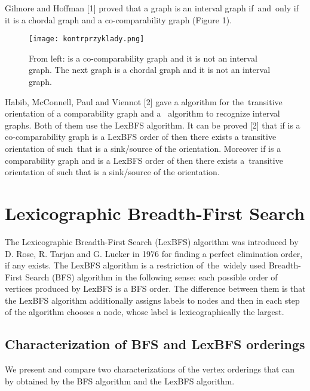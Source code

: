\documentclass[a4paper, 11pt]{article}
\begin{document}
Gilmore and Hoffman [1] proved that a graph is an interval graph if~and~only if it is a chordal 
graph and a co-comparability graph (Figure 1). 

\begin{figure}[h]
    \begin{center}
        \texttt{[image: kontrprzyklady.png]}
        \caption{From left:  is a co-comparability graph and it is not an interval graph.
        The next graph is a chordal graph and it is not an interval graph.}
    \end{center}
\end{figure}

\newpage

Habib, McConnell, Paul and Viennot [2] gave a  algorithm for the~transitive orientation 
of a comparability graph and a~\text{} algorithm to recognize interval graphs. Both of them
use the LexBFS algorithm. It can be proved [2] that if  is a co-comparability graph  is a LexBFS order of  then there exists a transitive orientation 
of  such~that  is a sink/source of the orientation. Moreover if  is a 
comparability graph and  is a LexBFS order of  then there 
exists a~transitive orientation of  such that  is a sink/source of the orientation. 



\section{Lexicographic Breadth-First Search}

The Lexicographic Breadth-First Search (LexBFS) algorithm was introduced by D. Rose, R. Tarjan 
and G. Lueker in 1976 for finding a perfect elimination order, if any exists. The LexBFS 
algorithm is a restriction of~the~widely used Breadth-First Search (BFS) algorithm in the 
following sense: each possible order of vertices produced by LexBFS is a BFS order. The 
difference between them is that the LexBFS algorithm additionally assigns labels to nodes 
and then in each step of the algorithm chooses a node, whose label is lexicographically 
the largest. 

\subsection{Characterization of BFS and LexBFS orderings}

We present and compare two characterizations of the vertex orderings that can by obtained 
by the BFS algorithm and the LexBFS algorithm.\\
\end{document}
